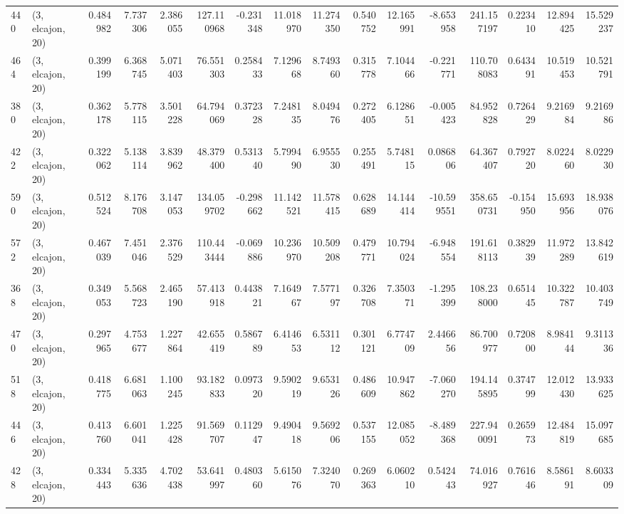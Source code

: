 \begin{tabular}{llrrrrrrrrrrrrrr}
440 &  (3, elcajon, 20) &   0.484982 &   7.737306 &   2.386055 &   127.110968 &  -0.231348 &  11.018970 &  11.274350 &  0.540752 &  12.165991 &  -8.653958 &   241.157197 &  0.223410 &  12.894425 &  15.529237 \\
464 &  (3, elcajon, 20) &   0.399199 &   6.368745 &   5.071403 &    76.551303 &   0.258433 &   7.129668 &   8.749360 &  0.315778 &   7.104466 &  -0.221771 &   110.708083 &  0.643491 &  10.519453 &  10.521791 \\
380 &  (3, elcajon, 20) &   0.362178 &   5.778115 &   3.501228 &    64.794069 &   0.372328 &   7.248135 &   8.049476 &  0.272405 &   6.128651 &  -0.005423 &    84.952828 &  0.726429 &   9.216984 &   9.216986 \\
422 &  (3, elcajon, 20) &   0.322062 &   5.138114 &   3.839962 &    48.379400 &   0.531340 &   5.799490 &   6.955530 &  0.255491 &   5.748115 &   0.086806 &    64.367407 &  0.792720 &   8.022460 &   8.022930 \\
590 &  (3, elcajon, 20) &   0.512524 &   8.176708 &   3.147053 &   134.059702 &  -0.298662 &  11.142521 &  11.578415 &  0.628689 &  14.144414 & -10.599551 &   358.650731 & -0.154950 &  15.693956 &  18.938076 \\
572 &  (3, elcajon, 20) &   0.467039 &   7.451046 &   2.376529 &   110.443444 &  -0.069886 &  10.236970 &  10.509208 &  0.479771 &  10.794024 &  -6.948554 &   191.618113 &  0.382939 &  11.972289 &  13.842619 \\
368 &  (3, elcajon, 20) &   0.349053 &   5.568723 &   2.465190 &    57.413918 &   0.443821 &   7.164967 &   7.577197 &  0.326708 &   7.350371 &  -1.295399 &   108.238000 &  0.651445 &  10.322787 &  10.403749 \\
470 &  (3, elcajon, 20) &   0.297965 &   4.753677 &   1.227864 &    42.655419 &   0.586789 &   6.414653 &   6.531112 &  0.301121 &   6.774709 &   2.446656 &    86.700977 &  0.720800 &   8.984144 &   9.311336 \\
518 &  (3, elcajon, 20) &   0.418775 &   6.681063 &   1.100245 &    93.182833 &   0.097320 &   9.590219 &   9.653126 &  0.486609 &  10.947862 &  -7.060270 &   194.145895 &  0.374799 &  12.012430 &  13.933625 \\
446 &  (3, elcajon, 20) &   0.413760 &   6.601041 &   1.225428 &    91.569707 &   0.112947 &   9.490418 &   9.569206 &  0.537155 &  12.085052 &  -8.489368 &   227.940091 &  0.265973 &  12.484819 &  15.097685 \\
428 &  (3, elcajon, 20) &   0.334443 &   5.335636 &   4.702438 &    53.641997 &   0.480360 &   5.615076 &   7.324070 &  0.269363 &   6.060210 &   0.542443 &    74.016927 &  0.761646 &   8.586191 &   8.603309 \\

\end{tabular}
